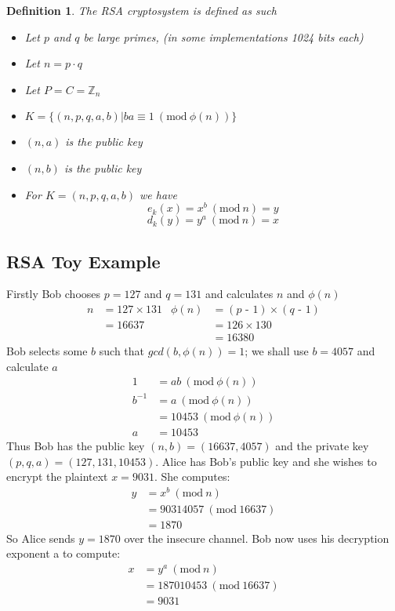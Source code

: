 \documentclass{article}
\theoremstyle{quest}
\newtheorem*{definition}{Definition}
\newcommand{\Z}{\mathbb{Z}}
\newcommand{\mns}{\textrm{ -  }}
\newcommand{\Mod}[1]{\ (\mathrm{mod}\ #1)}
\begin{document}
\begin{definition}
    The \textit{RSA cryptosystem} is defined as such
    \begin{itemize}
        \item Let $p$ and $q$ be large primes, (in some implementations 1024 bits each)
        \item Let $n = p \cdot q$
        \item Let $P = C = \Z_n$
        \item $K = \{(n,p,q,a,b) | ba \equiv 1 \Mod{\phi(n)}\}$
        \item $(n,a)$ is the public key
        \item $(n,b)$ is the public key
        \item For $K = (n,p,q,a,b)$ we have
            $$e_k(x) = x^b \Mod n = y$$
            $$d_k(y) = y^a \Mod n = x$$
    \end{itemize}
\end{definition}

\subsection{RSA Toy Example}
Firstly Bob chooses $p = 127$ and $q = 131$ and calculates $n$ and $\phi(n)$
\begin{align*}
    n &= 127  \times 131  &\phi(n) &= (p \mns 1) \times (q \mns 1)\\
      &= 16637            &        &= 126        \times 130       \\
      &                   &        &= 16380
\end{align*}
Bob selects some $b$ such that $gcd(b, \phi(n)) = 1$;
we shall use $b = 4057$ and calculate $a$
\begin{align*}
    1      &= ab \Mod{\phi(n)}\\
    b^{-1} &= a \Mod{\phi(n)}\\
           &= 10453 \Mod{\phi(n)}\\
         a &= 10453
\end{align*}
Thus Bob has the public key $(n,b) = (16637,4057)$ and the private key $(p,q,a) = (127, 131, 10453)$.
Alice has Bob’s public key and she wishes to encrypt the plaintext $x = 9031$.
She computes:
\begin{align*}
   y &= x^b \Mod{n} \\
     &= 90314057 \Mod{16637} \\
     &= 1870
\end{align*}
So Alice sends $y = 1870$ over the insecure channel. Bob now uses his decryption exponent a to compute:
\begin{align*}
   x &= y^a \Mod{n} \\
     &= 187010453 \Mod{16637} \\
     &= 9031
\end{align*}
\end{document}

